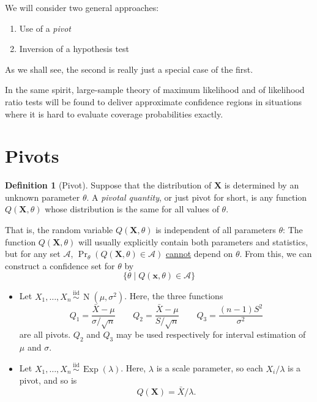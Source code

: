 \documentclass[
]{book}
\providecommand{\tightlist}{%
  \setlength{\itemsep}{0pt}\setlength{\parskip}{0pt}}
\newcommand{\bx}{{\boldsymbol x}}
\newcommand{\bX}{{\boldsymbol X}}
\DeclareMathOperator{\N}{N}
\DeclareMathOperator{\Exp}{Exp}
\newcommand{\iid}{\,\overset{\text{iid}}{\sim}\,}
\newcommand{\cA}{{\mathcal A}}
\theoremstyle{definition}
\newtheorem{definition}{Definition}[chapter]
\theoremstyle{definition}
\theoremstyle{definition}
\theoremstyle{definition}
\theoremstyle{remark}
\begin{document}
We will consider two general approaches:

\begin{enumerate}
\def\labelenumi{\arabic{enumi}.}
\tightlist
\item
  Use of a \emph{pivot}
\item
  Inversion of a hypothesis test
\end{enumerate}

As we shall see, the second is really just a special case of the first.

In the same spirit, large-sample theory of maximum likelihood and of likelihood ratio tests will be found to deliver approximate confidence regions in situations where it is hard to evaluate coverage probabilities exactly.

\hypertarget{pivots}{%
\section{Pivots}\label{pivots}}

\begin{definition}[Pivot]
Suppose that the distribution of \(\bX\) is determined by an unknown parameter \(\theta\). A \emph{pivotal quantity}, or just pivot for short, is any function \(Q(\bX,\theta)\) whose distribution is the same for all values of \(\theta\).
\end{definition}

That is, the random variable \(Q(\bX,\theta)\) is independent of all parameters \(\theta\): The function \(Q(\bX,\theta)\) will usually explicitly contain both parameters and statistics, but for any set \(\cA\), \(\Pr_\theta\left( Q(\bX,\theta) \in \cA \right)\) \uline{cannot} depend on \(\theta\).
From this, we can construct a confidence set for \(\theta\) by
\[
\{\theta \mid Q(\bx,\theta) \in \cA \}
\]

\begin{itemize}
\item
  Let \(X_1,\dots,X_n\iid \N(\mu,\sigma^2)\). Here, the three functions
  \[
  Q_1 = \frac{\bar X - \mu}{\sigma/\sqrt n} \hspace{2em}
  Q_2 = \frac{\bar X - \mu}{S/\sqrt n} \hspace{2em}
  Q_3 = \frac{(n-1)S^2}{\sigma^2}
  \]
  are all pivots. \(Q_2\) and \(Q_3\) may be used respectively for interval estimation of \(\mu\) and \(\sigma\).
\item
  Let \(X_1,\dots,X_n\iid\Exp(\lambda)\). Here, \(\lambda\) is a scale parameter, so each \(X_i/\lambda\) is a pivot, and so is \[Q(\bX)=\bar X / \lambda.\]
\end{itemize}
\end{document}
